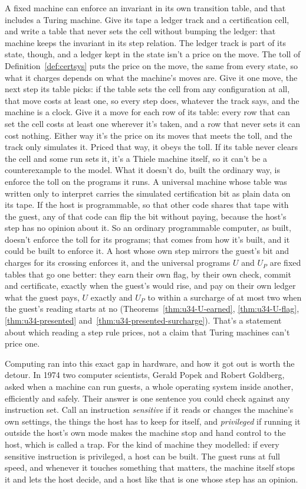 \documentclass[11pt,twoside]{article}
\theoremstyle{thielethm}
\theoremstyle{thieledef}
\theoremstyle{thieledef}
\theoremstyle{thieledef}
\theoremstyle{thielethm}
\theoremstyle{thieleobs}
\theoremstyle{thielethm}
\begin{document}
A fixed machine can enforce an invariant in its own transition table, and that includes a
Turing machine. Give its tape a ledger track and a certification cell, and write a table
that never sets the cell without bumping the ledger: that machine keeps the invariant in its
step relation. The ledger track is part of its state, though, and a ledger kept in the state
isn't a price on the move. The toll of Definition~\ref{def:certsys} puts the price on the move,
the same from every state, so what it charges depends on what the machine's moves are. Give it
one move, the next step its table picks: if the table sets the cell from any configuration at
all, that move costs at least one, so every step does, whatever the track says, and the machine
is a clock. Give it a move for each row of its table: every row that can set the cell costs at least one
wherever it's taken, and a row that never sets it can cost nothing. Either way it's the price on
its moves that meets the toll, and the track only simulates it. Priced that way, it obeys the toll.
If its table never clears the cell and some run sets it, it's a Thiele machine itself, so it can't
be a counterexample to the model.
What it doesn't do, built the ordinary way, is enforce the toll on the programs it runs. A
universal machine whose table was written only to interpret carries the simulated
certification bit as plain data on its tape. If the host is programmable, so that other code
shares that tape with the guest, any of that code can flip the bit without paying, because the
host's step has no opinion about it. So an ordinary programmable computer, as built, doesn't enforce the toll for its
programs; that comes from how it's built, and it could be built to enforce it. A host whose own
step mirrors the guest's bit and charges for its crossing enforces it, and the universal programs $U$
and $U_P$ are fixed tables that go one better: they earn their own flag, by their own check,
commit and certificate, exactly when the guest's would rise, and pay on their own ledger what the guest pays, $U$ exactly and $U_P$ to within
a surcharge of at most two when the guest's reading starts at no (Theorems~\ref{thm:u34-U-earned}, \ref{thm:u34-U-flag}, \ref{thm:u34-presented} and~\ref{thm:u34-presented-surcharge}). That's a statement
about which reading a step rule prices, not a claim that Turing machines can't price one.

Computing ran into this exact gap in hardware, and how it got out is worth the detour. In 1974
two computer scientists, Gerald Popek and Robert Goldberg, asked when a machine can run guests, a whole operating system
inside another, efficiently and safely. Their answer is one sentence you could check against any
instruction set. Call an instruction \emph{sensitive} if it reads or changes the machine's own
settings, the things the host has to keep for itself, and \emph{privileged} if running it
outside the host's own mode makes the machine stop and hand control to the host, which is
called a trap. For the kind of machine they modelled: if every sensitive instruction is
privileged, a host can be built. The guest runs at full speed, and whenever it touches
something that matters, the machine itself stops it and lets the host decide, and a host like that
is one whose step has an opinion.
\end{document}
